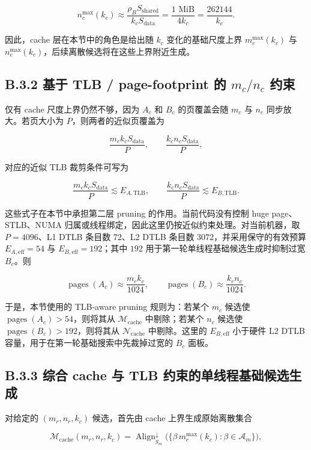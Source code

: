 \documentclass[a4paper,11pt,oneside]{article}
\begin{document}
$$
n_c^{\max}(k_c) \approx \frac{\rho_B S_{\text{shared}}}{k_c S_{\text{data}}}
= \frac{1\text{ MiB}}{4k_c}
= \frac{262144}{k_c}.
$$

因此，cache 层在本节中的角色是给出随 $k_c$ 变化的基础尺度上界 $m_c^{\max}(k_c)$ 与 $n_c^{\max}(k_c)$，后续离散候选将在这些上界附近生成。

\subsection*{B.3.2 基于 TLB / page-footprint 的 $m_c/n_c$ 约束}

仅有 cache 尺度上界仍然不够，因为 $A_c$ 和 $B_c$ 的页覆盖会随 $m_c$ 与 $n_c$ 同步放大。若页大小为 $P$，则两者的近似页覆盖为

$$
\frac{m_c k_c S_{\text{data}}}{P},
\qquad
\frac{k_c n_c S_{\text{data}}}{P},
$$

对应的近似 TLB 裁剪条件可写为

$$
\frac{m_c k_c S_{\text{data}}}{P} \lesssim E_{A,\text{TLB}},
\qquad
\frac{k_c n_c S_{\text{data}}}{P} \lesssim E_{B,\text{TLB}}.
$$

这些式子在本节中承担第二层 pruning 的作用。当前代码没有控制 huge page、STLB、NUMA 归属或线程绑定，因此这里仍按近似约束处理。对当前机器，取 $P=4096$、L1 DTLB 条目数 72、L2 DTLB 条目数 3072，并采用保守的有效预算 $E_{A,\text{eff}}=54$ 与 $E_{B,\text{eff}}=192$；其中 $192$ 用于第一轮单线程基础候选生成时抑制过宽 $B_c$。则

$$
\operatorname{pages}(A_c) \approx \frac{m_c k_c}{1024},
\qquad
\operatorname{pages}(B_c) \approx \frac{k_c n_c}{1024}.
$$

于是，本节使用的 TLB-aware pruning 规则为：若某个 $m_c$ 候选使 $\operatorname{pages}(A_c) > 54$，则将其从 $\mathcal{M}_{\text{cache}}$ 中剔除；若某个 $n_c$ 候选使 $\operatorname{pages}(B_c) > 192$，则将其从 $\mathcal{N}_{\text{cache}}$ 中剔除。这里的 $E_{B,\text{eff}}$ 小于硬件 L2 DTLB 容量，用于在第一轮基础搜索中先裁掉过宽的 $B_c$ 面板。

\subsection*{B.3.3 综合 cache 与 TLB 约束的单线程基础候选生成}

对给定的 $(m_r,n_r,k_c)$ 候选，首先由 cache 上界生成原始离散集合

$$
\mathcal{M}_{\text{cache}}(m_r,n_r,k_c)
= \operatorname{Align}^{\downarrow}_{g_m}\bigl(\{\beta\, m_c^{\max}(k_c) : \beta \in \mathcal{A}_m\}\bigr),
$$
\end{document}
